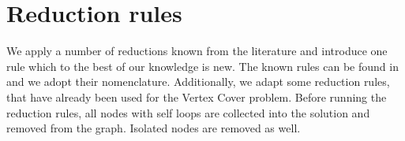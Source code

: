 
\section{Reduction rules}\label{sec:reductions}
We apply a number of reductions known from the literature and introduce one rule which to the best of our knowledge is new.
The known rules can be found in \cite{lemaic2008markov} and we adopt their nomenclature.
Additionally, we adapt some reduction rules, that have already been used for the Vertex Cover problem.
Before running the reduction rules, all nodes with self loops are collected into the solution and removed from the graph.
Isolated nodes are removed as well.















